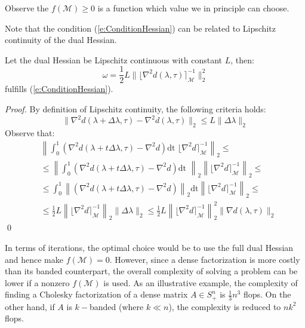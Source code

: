 \begin{remark}
Observe the $f(\mathcal{M}) \geq 0$ is a function which value we in principle can choose.
\end{remark}
Note that the condition (\ref{e:ConditionHessian}) can be related to Lipschitz continuity of the dual Hessian.
\begin{proposition}
Let the dual Hessian be Lipschitz continuous with constant $L$, then:
\begin{equation}
\omega = \frac{1}{2} L \| \lfloor \nabla^2 d(\lambda, \tau) \rceil_{\mathcal{M}}^{-1} \|_2^2
\end{equation}
fulfills (\ref{e:ConditionHessian}).
\end{proposition}
\begin{proof}
By definition of Lipschitz continuity, the following criteria holds:
\begin{equation}
\| \nabla^2 d(\lambda + \Delta \lambda, \tau) - \nabla^2 d(\lambda, \tau) \|_2 \leq L \| \Delta \lambda \|_2
\end{equation} 
Observe that:
\begin{equation}
\begin{aligned}
& \left\| \int_0^1 ( \nabla^2 d(\lambda + t \Delta \lambda, \tau) - \nabla^2 d ) \text{dt } \lfloor \nabla^2 d \rceil_{\mathcal{M}}^{-1} \right\|_2 \leq \\
& \leq \left\| \int_0^1 ( \nabla^2 d(\lambda + t \Delta \lambda, \tau) - \nabla^2 d ) \text{dt } \right\|_2 \left\| \lfloor \nabla^2 d \rceil_{\mathcal{M}}^{-1} \right\|_2 \leq \\
& \leq \int_0^1 \left\| ( \nabla^2 d(\lambda + t \Delta \lambda, \tau) - \nabla^2 d ) \right\|_2 \text{dt} \left\| \lfloor \nabla^2 d \rceil_{\mathcal{M}}^{-1} \right\|_2 \leq \\
& \leq \frac{1}{2} L \left\| \lfloor \nabla^2 d \rceil_{\mathcal{M}}^{-1} \right\|_2 \| \Delta \lambda \|_2 \leq \frac{1}{2} L \left\| \lfloor \nabla^2 d \rceil_{\mathcal{M}}^{-1} \right\|_2^2 \| \nabla d(\lambda, \tau) \|_2
\end{aligned}
\end{equation}
\qed
\end{proof}

In terms of iterations, the optimal choice would be to use the full dual Hessian and hence make $f(\mathcal{M}) = 0$. However, since a dense factorization is more costly than its banded counterpart, the overall complexity of solving a problem can be lower if a nonzero $f(\mathcal{M})$ is used. As an illustrative example, the complexity of finding a Cholesky factorization of a dense matrix $A \in S_{+}^n$ is $\frac{1}{3}n^3$ flops. On the other hand, if $A$ is $k-$banded (where $k \ll n$), the complexity is reduced to $nk^2$ flops.

